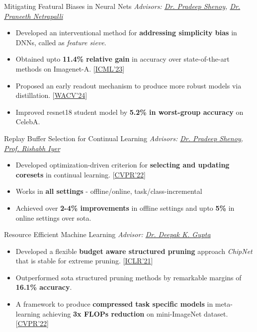 
\begin{projects}

\project
	{Mitigating Featural Biases in Neural Nets}{}
	{
	    \textit{Advisors:  \href{https://sites.google.com/site/pshenoyuw/}{Dr. Pradeep Shenoy}, \href{https://praneethnetrapalli.org/}{Dr. Praneeth Netrapalli}}
	}
	{\begin{itemize}
	\setlength\itemsep{0.3em}
     \item Developed an interventional method for \textbf{addressing simplicity bias} in DNNs, called as \textit{feature sieve}. 
     \item Obtained upto \textbf{11.4\% relative gain} in accuracy over state-of-the-art methods on Imagenet-A. [\hyperref[C8]{ICML'23}]
     \item Proposed an early readout mechanism to produce more robust models via distillation. [\hyperref[C7]{WACV'24}]
     \item Improved resnet18 student model by \textbf{5.2\% in worst-group accuracy} on CelebA.
     \end{itemize}}
     
\project
	{Replay Buffer Selection for Continual Learning}{}
	{
	    \textit{Advisors:  \href{https://sites.google.com/site/pshenoyuw/}{Dr. Pradeep Shenoy}, \href{https://sites.google.com/corp/view/rishabhiyer/}{Prof. Rishabh Iyer}}
	}
	{\begin{itemize}
	\setlength\itemsep{0.3em}
     \item Developed optimization-driven criterion for \textbf{selecting and updating coresets} in continual learning. [\hyperref[C4]{CVPR'22}]
     \item Works in \textbf{all settings} - offline/online, task/class-incremental
     \item Achieved over \textbf{2-4\% improvements} in offline settings and upto \textbf{5\%} in online settings over sota.
     \end{itemize}}
\project
	{Resource Efficient Machine Learning}{}
	{
	    \textit{Advisor:  \href{https://dkgupta90.github.io/}{Dr. Deepak K. Gupta}}
	}
	{
	\begin{itemize}
	\setlength\itemsep{0.3em}
	\item Developed a flexible \textbf{budget aware structured pruning} approach \textit{ChipNet} that is stable for extreme pruning. [\hyperref[C2]{ICLR'21}]
	\item Outperformed sota structured pruning methods by remarkable margins of \textbf{16.1\% accuracy}.
    \item A framework to produce \textbf{compressed task specific models} in meta-learning achieving \textbf{3x FLOPs reduction} on mini-ImageNet dataset. [\hyperref[C3]{CVPR'22}] 
     \end{itemize}
    }

\end{projects}    
\vspace{-4mm}

